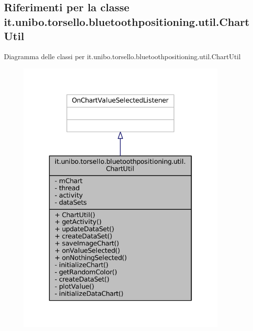 \hypertarget{classit_1_1unibo_1_1torsello_1_1bluetoothpositioning_1_1util_1_1ChartUtil}{}\subsection{Riferimenti per la classe it.\+unibo.\+torsello.\+bluetoothpositioning.\+util.\+Chart\+Util}
\label{classit_1_1unibo_1_1torsello_1_1bluetoothpositioning_1_1util_1_1ChartUtil}


Diagramma delle classi per it.\+unibo.\+torsello.\+bluetoothpositioning.\+util.\+Chart\+Util
\nopagebreak
\begin{figure}[H]
\begin{center}
\leavevmode
\includegraphics[width=298pt]{classit_1_1unibo_1_1torsello_1_1bluetoothpositioning_1_1util_1_1ChartUtil__inherit__graph}
\end{center}
\end{figure}


